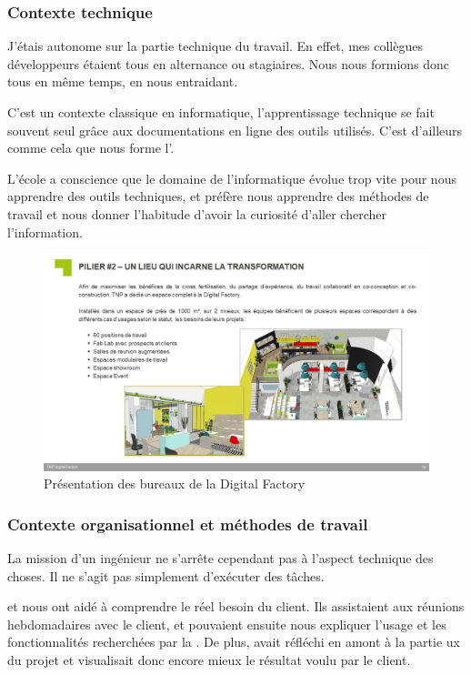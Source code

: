 \subsubsection{Contexte technique}

J'étais autonome sur la partie technique du travail. En effet, mes collègues développeurs étaient tous en alternance ou stagiaires. Nous nous formions donc tous en même temps, en nous entraidant.

C'est un contexte classique en informatique, l'apprentissage technique se fait souvent seul grâce aux documentations en ligne des outils utilisés. C'est d'ailleurs comme cela que nous forme l'\epita.

L'école a conscience que le domaine de l'informatique évolue trop vite pour nous apprendre des outils techniques, et préfère nous apprendre des méthodes de travail et nous donner l'habitude d'avoir la curiosité d'aller chercher l'information.

\begin{figure}[H]
    \centering
    \includegraphics[width=1\linewidth]{img/digital_factory_lieu.png}
    \caption{Présentation des bureaux de la Digital Factory}
\end{figure}

\subsubsection{Contexte organisationnel et méthodes de travail}

La mission d'un ingénieur ne s'arrête cependant pas à l'aspect technique des choses. Il ne s'agit pas simplement d'exécuter des tâches.

\damien et \stefan nous ont aidé à comprendre le réel besoin du client. Ils assistaient aux réunions hebdomadaires avec le client, et pouvaient ensuite nous expliquer l'usage et les fonctionnalités recherchées par la \sncf. De plus, \stefan avait réfléchi en amont à la partie \gls{ux} du projet et visualisait donc encore mieux le résultat voulu par le client.


